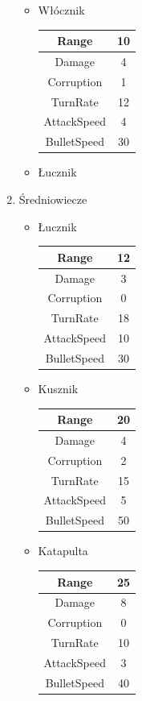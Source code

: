 \documentclass[a4paper,12pt, twoside, titlepage]{article}
\begin{document}
\begin{enumerate}
\begin{itemize}
		\item Włócznik
		\begin{longtable}[l]{|c|c|} 
		\hline
		Range & 10 \\
		\hline
		Damage & 4 \\ 
		\hline 
		Corruption & 1 \\ 
		\hline
		TurnRate & 12 \\ 
		\hline
		AttackSpeed & 4 \\ 
		\hline
		BulletSpeed & 30 \\ 
		\hline
		\end{longtable}	
		\item Łucznik
		
	\end{itemize}

	\item Średniowiecze
	\begin{itemize}
		\item Łucznik
		\begin{longtable}[l]{|c|c|} 
		\hline
		Range & 12 \\
		\hline
		Damage & 3 \\ 
		\hline 
		Corruption & 0 \\ 
		\hline
		TurnRate & 18 \\ 
		\hline
		AttackSpeed & 10 \\ 
		\hline
		BulletSpeed & 30 \\ 
		\hline
		\end{longtable}	
		
		\item Kusznik
		\begin{longtable}[l]{|c|c|} 
		\hline
		Range & 20 \\
		\hline
		Damage & 4 \\ 
		\hline 
		Corruption & 2 \\ 
		\hline
		TurnRate & 15 \\ 
		\hline
		AttackSpeed & 5 \\ 
		\hline
		BulletSpeed & 50 \\ 
		\hline
		\end{longtable}		
	
		\item Katapulta
		\begin{longtable}[l]{|c|c|} 
		\hline
		Range & 25 \\
		\hline
		Damage & 8 \\ 
		\hline 
		Corruption & 0 \\ 
		\hline
		TurnRate & 10 \\ 
		\hline
		AttackSpeed & 3 \\ 
		\hline
		BulletSpeed & 40 \\ 
		\hline
		\end{longtable}	
	\end{itemize}
	
\end{enumerate} 
 
\end{document}
